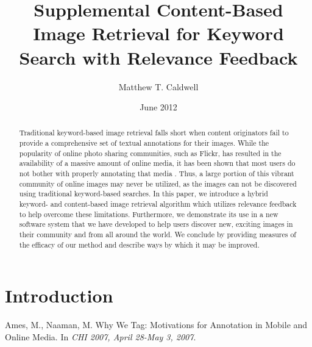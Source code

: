 \documentclass{article}
\title{Supplemental Content-Based Image Retrieval for Keyword Search with Relevance Feedback}
\author{Matthew T. Caldwell}
\date{June 2012}
\begin{document}
\maketitle

\begin{abstract}
Traditional keyword-based image retrieval falls short when content originators fail to provide a comprehensive set of
textual annotations for their images.  While the popularity of online photo sharing communities, such as
Flickr, has resulted in the availability of a massive amount of online media, it has been shown that most users do not bother
with properly annotating that media \cite{whywetag}.  Thus, a large portion of this vibrant community of online images
may never be
utilized, as the images can not be discovered using traditional keyword-based searches.  In this paper, we introduce a
hybrid keyword- and content-based image retrieval algorithm which utilizes relevance feedback to help overcome these
limitations.  Furthermore, we demonstrate its use in a new software system that we have developed to help users
discover new, exciting images in their community and from all around the world.  We conclude by providing measures of the
efficacy of our method
and describe ways by which it may be improved.
\end{abstract}

\section{Introduction}


\begin{thebibliography}{99}
   Ames, M., Naaman, M.  Why We Tag: Motivations for Annotation in Mobile and Online Media.  In
    {\em CHI 2007, April 28-May 3, 2007}.
\end{thebibliography}
\end{document}
